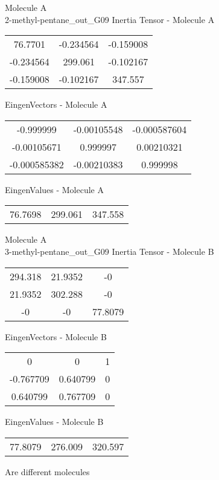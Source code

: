 \newpage
\begin{multicols}{2}
\begin{center}
Molecule A \\ 
2-methyl-pentane_out_G09
Inertia Tensor - Molecule A \\
\vtab
\begin{tabular}{|c c c|}
76.7701	 & 	-0.234564	 & 	-0.159008	 \\
-0.234564	 & 	299.061	 & 	-0.102167	 \\
-0.159008	 & 	-0.102167	 & 	347.557
\end{tabular}

\vtab
 EingenVectors - Molecule A     \\
\vtab
\begin{tabular}{|c c c|}
-0.999999	 & 	-0.00105548	 & 	-0.000587604	 \\
-0.00105671	 & 	0.999997	 & 	0.00210321	 \\
-0.000585382	 & 	-0.00210383	 & 	0.999998
\end{tabular}

\vtab
 EingenValues - Molecule A     \\
\vtab
\begin{tabular}{|c c c|}
76.7698	 & 	299.061	 & 	347.558
\end{tabular}
\columnbreak
Molecule A \\ 
3-methyl-pentane_out_G09
Inertia Tensor - Molecule B \\
\vtab
\begin{tabular}{|c c c|}
294.318	 & 	21.9352	 & 	-0	 \\
21.9352	 & 	302.288	 & 	-0	 \\
-0	 & 	-0	 & 	77.8079
\end{tabular}

\vtab
 EingenVectors - Molecule B     \\
\vtab
\begin{tabular}{|c c c|}
0	 & 	0	 & 	1	 \\
-0.767709	 & 	0.640799	 & 	0	 \\
0.640799	 & 	0.767709	 & 	0
\end{tabular}

\vtab
 EingenValues - Molecule B     \\
\vtab
\begin{tabular}{|c c c|}
77.8079	 & 	276.009	 & 	320.597
\end{tabular}
\textcolor{NavyBlue}{\large Are different molecules}
\end{center}
\end{multicols}
